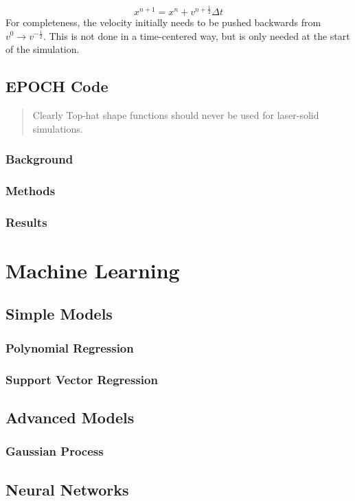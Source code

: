 \begin{equation}
	x^{n+1} = x^{n} + v^{n+\frac{1}{2}} \Delta t \label{eq:particlepush}
\end{equation}
For completeness, the velocity initially needs to be pushed backwards from $v^{0} \rightarrow v^{-\frac{1}{2}}$. This is not done in a time-centered way, but is only needed at the start of the simulation. 

\subsection{EPOCH Code}

\begin{quote}
	Clearly Top-hat shape functions should never be used for laser-solid simulations.
\end{quote}

\subsubsection{Background}

\subsubsection{Methods}

\subsubsection{Results}

\section{Machine Learning}

\subsection{Simple Models}

\subsubsection{Polynomial Regression}

\subsubsection{Support Vector Regression}


\subsection{Advanced Models}

\subsubsection{Gaussian Process}

\subsection{Neural Networks}